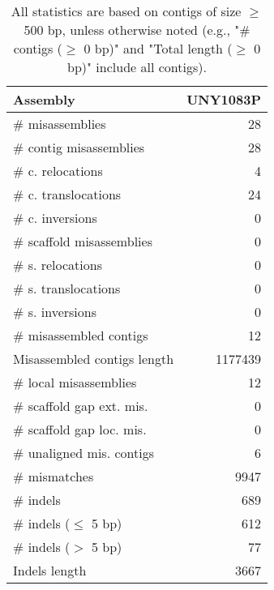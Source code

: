 \documentclass[12pt,a4paper]{article}
\begin{document}
\begin{table}[ht]
\begin{center}
\caption{All statistics are based on contigs of size $\geq$ 500 bp, unless otherwise noted (e.g., "\# contigs ($\geq$ 0 bp)" and "Total length ($\geq$ 0 bp)" include all contigs).}
\begin{tabular}{|l*{1}{|r}|}
\hline
Assembly & UNY1083P \\ \hline
\# misassemblies & 28 \\ \hline
\hspace{2mm}\# contig misassemblies & 28 \\ \hline
\hspace{5mm}\# c. relocations & 4 \\ \hline
\hspace{5mm}\# c. translocations & 24 \\ \hline
\hspace{5mm}\# c. inversions & 0 \\ \hline
\hspace{2mm}\# scaffold misassemblies & 0 \\ \hline
\hspace{5mm}\# s. relocations & 0 \\ \hline
\hspace{5mm}\# s. translocations & 0 \\ \hline
\hspace{5mm}\# s. inversions & 0 \\ \hline
\# misassembled contigs & 12 \\ \hline
Misassembled contigs length & 1177439 \\ \hline
\# local misassemblies & 12 \\ \hline
\# scaffold gap ext. mis. & 0 \\ \hline
\# scaffold gap loc. mis. & 0 \\ \hline
\# unaligned mis. contigs & 6 \\ \hline
\# mismatches & 9947 \\ \hline
\# indels & 689 \\ \hline
\hspace{5mm}\# indels ($\leq$ 5 bp) & 612 \\ \hline
\hspace{5mm}\# indels ($>$ 5 bp) & 77 \\ \hline
Indels length & 3667 \\ \hline
\end{tabular}
\end{center}
\end{table}
\end{document}
